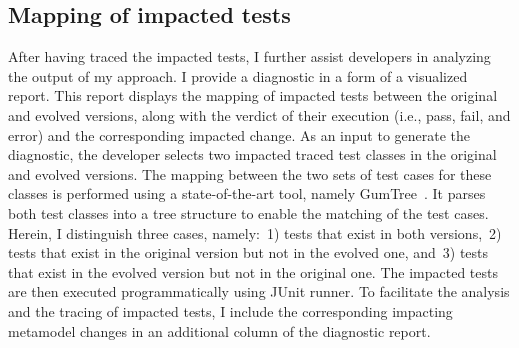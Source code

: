 

\subsection{Mapping of impacted tests}

After having traced the impacted tests, I further assist developers in analyzing the output of my approach. I provide a diagnostic in a form of a visualized report. This report displays the mapping of impacted tests between the original and evolved versions, along with the verdict of their execution (i.e., pass, fail, and error) and the corresponding impacted change. As an input to generate the diagnostic, the developer selects two impacted traced test classes in the original and evolved versions.
The mapping between the two sets of test cases for these classes is performed using a state-of-the-art tool, namely GumTree~\cite{falleri2014fine}. It parses both test classes into a tree structure to enable the matching of the test cases. Herein, I distinguish three cases, namely:~1) tests that exist in both versions,~2) tests that exist in the original version but not in the evolved one, and~3) tests that exist in the evolved version but not in the original one.
The impacted tests are then executed programmatically using JUnit runner. To facilitate the analysis and the tracing of impacted tests, I include the corresponding impacting metamodel changes in an additional column of the diagnostic report.  

	
